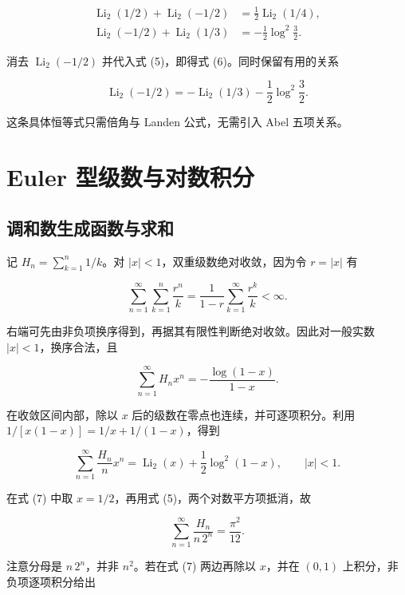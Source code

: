 \documentclass[11pt,a4paper]{article}
\begin{document}
\[
\begin{aligned}
\operatorname{Li}_2(1/2)+\operatorname{Li}_2(-1/2)
&=\frac12\operatorname{Li}_2(1/4),\\
\operatorname{Li}_2(-1/2)+\operatorname{Li}_2(1/3)
&=-\frac12\log^2\!\frac32.
\end{aligned}
\]

消去 \(\operatorname{Li}_2(-1/2)\) 并代入式 (5)，即得式 (6)。同时保留有用的关系

\[
\operatorname{Li}_2(-1/2)=-\operatorname{Li}_2(1/3)-\frac12\log^2\!\frac32.
\]

这条具体恒等式只需倍角与 Landen 公式，无需引入 Abel 五项关系。

\hypertarget{euler-ux578bux7ea7ux6570ux4e0eux5bf9ux6570ux79efux5206}{%
\section{Euler 型级数与对数积分}\label{euler-ux578bux7ea7ux6570ux4e0eux5bf9ux6570ux79efux5206}}

\hypertarget{ux8c03ux548cux6570ux751fux6210ux51fdux6570ux4e0eux6c42ux548c}{%
\subsection{调和数生成函数与求和}\label{ux8c03ux548cux6570ux751fux6210ux51fdux6570ux4e0eux6c42ux548c}}

记 \(H_n=\sum_{k=1}^n1/k\)。对 \(|x|<1\)，双重级数绝对收敛，因为令 \(r=|x|\) 有

\[
\sum_{n=1}^{\infty}\sum_{k=1}^n\frac{r^n}{k}
=\frac1{1-r}\sum_{k=1}^{\infty}\frac{r^k}{k}<\infty.
\]

右端可先由非负项换序得到，再据其有限性判断绝对收敛。因此对一般实数 \(|x|<1\)，换序合法，且

\[
\sum_{n=1}^{\infty}H_nx^n=-\frac{\log(1-x)}{1-x}.
\]

在收敛区间内部，除以 \(x\) 后的级数在零点也连续，并可逐项积分。利用 \(1/[x(1-x)]=1/x+1/(1-x)\)，得到

\begin{equation}
\sum_{n=1}^{\infty}\frac{H_n}{n}x^n
=\operatorname{Li}_2(x)+\frac12\log^2(1-x),
\qquad |x|<1.
\tag{7}
\end{equation}

在式 (7) 中取 \(x=1/2\)，再用式 (5)，两个对数平方项抵消，故

\[
\sum_{n=1}^{\infty}\frac{H_n}{n\,2^n}=\frac{\pi^2}{12}.
\]

注意分母是 \(n\,2^n\)，并非 \(n^2\)。若在式 (7) 两边再除以 \(x\)，并在 \((0,1)\) 上积分，非负项逐项积分给出
\end{document}
